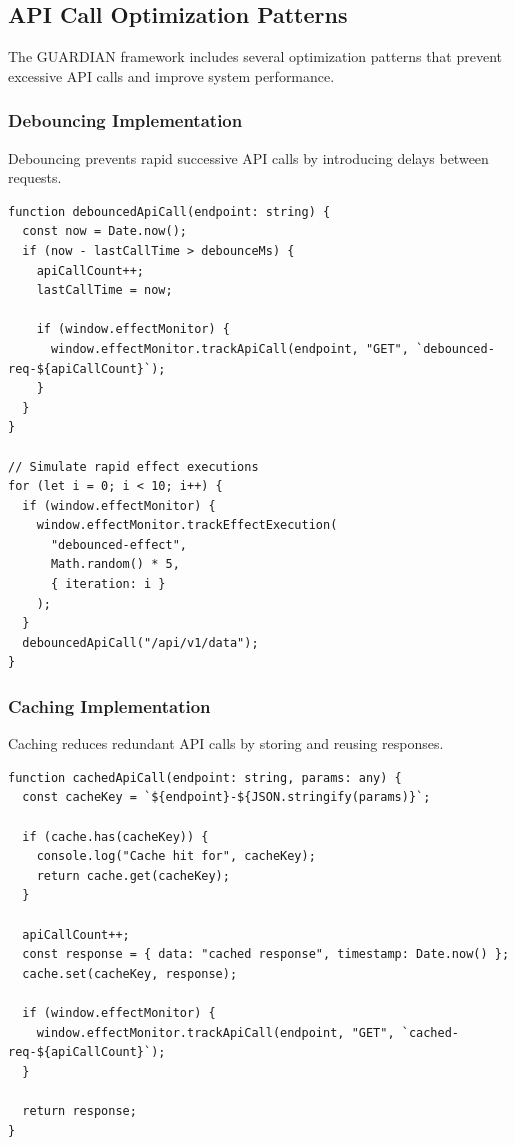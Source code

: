 \documentclass[10pt]{article}
\begin{document}
\subsection{API Call Optimization Patterns}

The GUARDIAN framework includes several optimization patterns that prevent excessive API calls and improve system performance.

\subsubsection{Debouncing Implementation}

Debouncing prevents rapid successive API calls by introducing delays between requests.

\begin{lstlisting}[caption={API Call Debouncing Implementation}]
function debouncedApiCall(endpoint: string) {
  const now = Date.now();
  if (now - lastCallTime > debounceMs) {
    apiCallCount++;
    lastCallTime = now;
    
    if (window.effectMonitor) {
      window.effectMonitor.trackApiCall(endpoint, "GET", `debounced-req-${apiCallCount}`);
    }
  }
}

// Simulate rapid effect executions
for (let i = 0; i < 10; i++) {
  if (window.effectMonitor) {
    window.effectMonitor.trackEffectExecution(
      "debounced-effect",
      Math.random() * 5,
      { iteration: i }
    );
  }
  debouncedApiCall("/api/v1/data");
}
\end{lstlisting}

\subsubsection{Caching Implementation}

Caching reduces redundant API calls by storing and reusing responses.

\begin{lstlisting}[caption={API Response Caching Implementation}]
function cachedApiCall(endpoint: string, params: any) {
  const cacheKey = `${endpoint}-${JSON.stringify(params)}`;
  
  if (cache.has(cacheKey)) {
    console.log("Cache hit for", cacheKey);
    return cache.get(cacheKey);
  }

  apiCallCount++;
  const response = { data: "cached response", timestamp: Date.now() };
  cache.set(cacheKey, response);
  
  if (window.effectMonitor) {
    window.effectMonitor.trackApiCall(endpoint, "GET", `cached-req-${apiCallCount}`);
  }
  
  return response;
}
\end{lstlisting}
\end{document}
